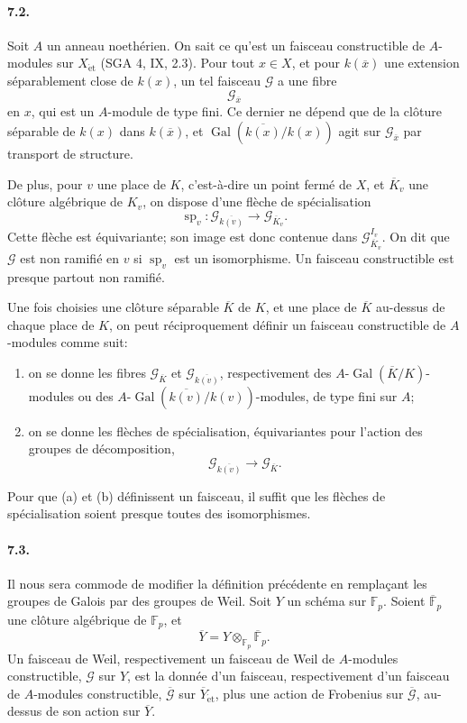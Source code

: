 \documentclass[10pt,letterpaper]{article}
\newcommand{\F}{\mathbb F}
\newcommand{\Gal}{\operatorname{Gal}}
\providecommand{\spc}{\operatorname{sp}}
\providecommand{\Gal}{\operatorname{Gal}}
\providecommand{\spc}{\operatorname{sp}}
\providecommand{\Gal}{\operatorname{Gal}}
\providecommand{\Gal}{\operatorname{Gal}}
\providecommand{\spc}{\operatorname{sp}}
\providecommand{\Gal}{\operatorname{Gal}}
\begin{document}
\paragraph{7.2.} Soit \(A\) un anneau noethérien. On sait ce qu'est un faisceau constructible de \(A\)-modules sur \(X_{\mathrm{\acute et}}\) (SGA 4, IX, 2.3). Pour tout \(x\in X\), et pour \(k(\overline x)\) une extension séparablement close de \(k(x)\), un tel faisceau \(\mathcal G\) a une fibre
\[
\mathcal G_{\overline x}
\]
en \(x\), qui est un \(A\)-module de type fini. Ce dernier ne dépend que de la clôture séparable de \(k(x)\) dans \(k(\overline x)\), et \(\Gal(\overline{k(x)}/k(x))\) agit sur \(\mathcal G_{\overline x}\) par transport de structure.

De plus, pour \(v\) une place de \(K\), c'est-à-dire un point fermé de \(X\), et \(\overline K_v\) une clôture algébrique de \(K_v\), on dispose d'une flèche de spécialisation
\[
\spc_v:\mathcal G_{\overline{k(v)}}\longrightarrow \mathcal G_{\overline K_v}.
\]
Cette flèche est équivariante; son image est donc contenue dans \(\mathcal G_{\overline K_v}^{I_v}\). On dit que \(\mathcal G\) est non ramifié en \(v\) si \(\spc_v\) est un isomorphisme. Un faisceau constructible est presque partout non ramifié.

Une fois choisies une clôture séparable \(\overline K\) de \(K\), et une place de \(\overline K\) au-dessus de chaque place de \(K\), on peut réciproquement définir un faisceau constructible de \(A\)-modules comme suit:
\begin{enumerate}[label=(\alph*)]
\item on se donne les fibres \(\mathcal G_{\overline K}\) et \(\mathcal G_{\overline{k(v)}}\), respectivement des \(A\)-\(\Gal(\overline K/K)\)-modules ou des \(A\)-\(\Gal(\overline{k(v)}/k(v))\)-modules, de type fini sur \(A\);
\item on se donne les flèches de spécialisation, équivariantes pour l'action des groupes de décomposition,
\[
\mathcal G_{\overline{k(v)}}\longrightarrow\mathcal G_{\overline K}.
\]
\end{enumerate}
Pour que (a) et (b) définissent un faisceau, il suffit que les flèches de spécialisation soient presque toutes des isomorphismes.

\paragraph{7.3.} Il nous sera commode de modifier la définition précédente en remplaçant les groupes de Galois par des groupes de Weil. Soit \(Y\) un schéma sur \(\F_p\). Soient \(\overline{\F}_p\) une clôture algébrique de \(\F_p\), et
\[
\overline Y=Y\otimes_{\F_p}\overline{\F}_p.
\]
Un faisceau de Weil, respectivement un faisceau de Weil de \(A\)-modules constructible, \(\mathcal G\) sur \(Y\), est la donnée d'un faisceau, respectivement d'un faisceau de \(A\)-modules constructible, \(\overline{\mathcal G}\) sur \(\overline Y_{\mathrm{\acute et}}\), plus une action de Frobenius sur \(\overline{\mathcal G}\), au-dessus de son action sur \(\overline Y\).
\end{document}
